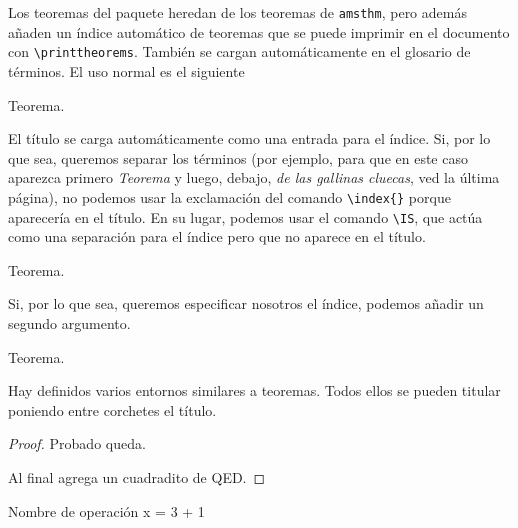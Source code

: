 Los teoremas del paquete heredan de los teoremas de \texttt{amsthm}, pero además añaden un índice automático de teoremas que se puede imprimir en el documento con \verb|\printtheorems|. También se cargan automáticamente en el glosario de términos. El uso normal es el siguiente

\begin{LTXexample}[pos=r]
\begin{theorem}
Teorema.
\end{theorem}
\end{LTXexample}

El título se carga automáticamente como una entrada para el índice. Si, por lo que sea, queremos separar los términos (por ejemplo, para que en este caso aparezca primero \textit{Teorema} y luego, debajo, \textit{de las gallinas cluecas}, ved la última página), no podemos usar la exclamación del comando \verb|\index{}| porque aparecería en el título. En su lugar, podemos usar el comando \verb|\IS|, que actúa como una separación para el índice pero que no aparece en el título.

\begin{LTXexample}[pos=r]
\begin{theorem}
Teorema.
\end{theorem}
\end{LTXexample}

Si, por lo que sea, queremos especificar nosotros el índice, podemos añadir un segundo argumento.

\begin{LTXexample}[pos=r]
\begin{theorem}
Teorema.
\end{theorem}
\end{LTXexample}

Hay definidos varios entornos similares a teoremas. Todos ellos se pueden titular poniendo entre corchetes el título.

\begin{LTXexample}[pos=r]
\begin{lemma}
\end{lemma}

\begin{corol}[Coro]
\end{corol}

\begin{prop}
\end{prop}

\begin{axiom}
\end{axiom}

\begin{proof}
Probado queda.

Al final agrega un cuadradito de QED.
\end{proof}

\begin{op}{Nombre de operación}
x = 3 + 1
\end{op}
\end{LTXexample}

